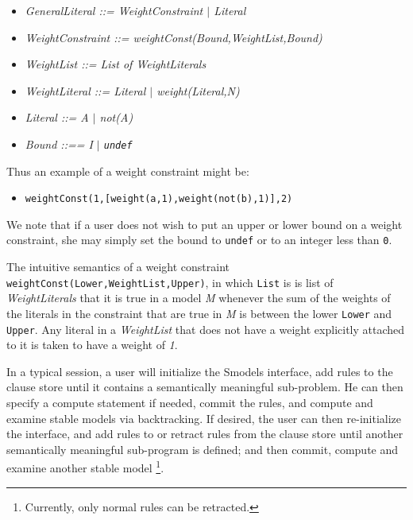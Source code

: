 \begin{itemize}

\item {\em GeneralLiteral ::= WeightConstraint $|$ Literal }

\item {\em WeightConstraint ::= weightConst(Bound,WeightList,Bound) }

\item {\em WeightList ::= List of WeightLiterals }

\item {\em WeightLiteral ::= Literal $|$ weight(Literal,N) }

\item {\em Literal ::= A $|$ not(A) }

\item {\em Bound ::== I $|$ {\tt undef} }

\end{itemize}

Thus an example of a weight constraint might be: 
\begin{itemize}
\item {\tt weightConst(1,[weight(a,1),weight(not(b),1)],2)}
\end{itemize}
We note that if a user does not wish to put an upper or lower bound on
a weight constraint, she may simply set the bound to {\tt undef} or to
an integer less than {\tt 0}.  
 
The intuitive semantics of a weight constraint
{\tt weightConst(Lower,WeightList,Upper)}, in which {\tt List} is is
list of \emph{WeightLiterals} that it is true in a model \emph{M} whenever
the sum of the weights of the literals in the constraint that are true
in \emph{M} is between the lower {\tt Lower} and {\tt Upper}.  Any literal
in a \emph{WeightList} that does not have a weight explicitly attached
to it is taken to have a weight of \emph{1}.

In a typical session, a user will initialize the Smodels interface,
add rules to the clause store until it contains a semantically
meaningful sub-problem.  He can then specify a compute statement if
needed, commit the rules, and compute and examine stable models via
backtracking.  If desired, the user can then re-initialize the
interface, and add rules to or retract rules from the clause store
until another semantically meaningful sub-program is defined; and then
commit, compute and examine another stable model \footnote{Currently,
only normal rules can be retracted.}.

